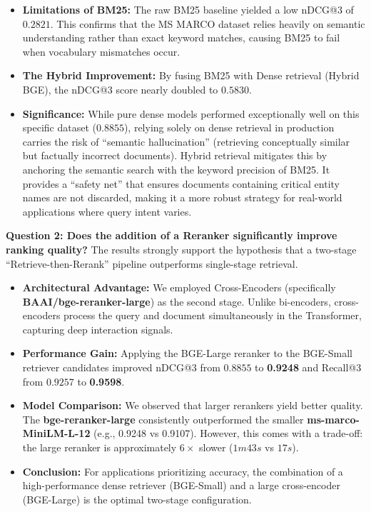 \begin{itemize}
    \item \textbf{Limitations of BM25:} The raw BM25 baseline yielded a low nDCG@3 of $0.2821$. This confirms that the MS MARCO dataset relies heavily on semantic understanding rather than exact keyword matches, causing BM25 to fail when vocabulary mismatches occur.
    \item \textbf{The Hybrid Improvement:} By fusing BM25 with Dense retrieval (Hybrid BGE), the nDCG@3 score nearly doubled to $0.5830$.
    \item \textbf{Significance:} While pure dense models performed exceptionally well on this specific dataset ($0.8855$), relying solely on dense retrieval in production carries the risk of ``semantic hallucination'' (retrieving conceptually similar but factually incorrect documents). Hybrid retrieval mitigates this by anchoring the semantic search with the keyword precision of BM25. It provides a ``safety net'' that ensures documents containing critical entity names are not discarded, making it a more robust strategy for real-world applications where query intent varies.
\end{itemize}

\textbf{Question 2: Does the addition of a Reranker significantly improve ranking quality?}
The results strongly support the hypothesis that a two-stage ``Retrieve-then-Rerank'' pipeline outperforms single-stage retrieval.

\begin{itemize}
    \item \textbf{Architectural Advantage:} We employed Cross-Encoders (specifically \textbf{BAAI/bge-reranker-large}) as the second stage. Unlike bi-encoders, cross-encoders process the query and document simultaneously in the Transformer, capturing deep interaction signals.
    \item \textbf{Performance Gain:} Applying the BGE-Large reranker to the BGE-Small retriever candidates improved nDCG@3 from $0.8855$ to \textbf{0.9248} and Recall@3 from $0.9257$ to \textbf{0.9598}.
    \item \textbf{Model Comparison:} We observed that larger rerankers yield better quality. The \textbf{bge-reranker-large} consistently outperformed the smaller \textbf{ms-marco-MiniLM-L-12} (e.g., 0.9248 vs 0.9107). However, this comes with a trade-off: the large reranker is approximately $6\times$ slower ($1m43s$ vs $17s$).
    \item \textbf{Conclusion:} For applications prioritizing accuracy, the combination of a high-performance dense retriever (BGE-Small) and a large cross-encoder (BGE-Large) is the optimal two-stage configuration.
\end{itemize}

